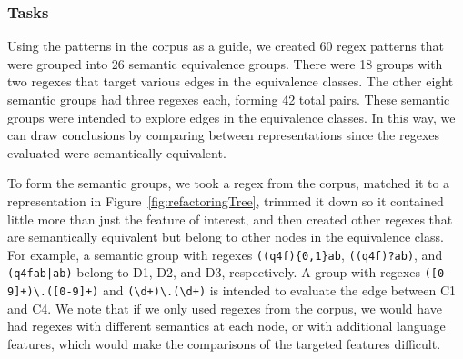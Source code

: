 \subsubsection{Tasks}
Using the patterns in the corpus as a guide, we created 60 regex patterns that were grouped into 26 semantic equivalence groups.
 There were 18 groups with two regexes that target various edges in the equivalence classes.
The other eight semantic groups had three regexes each, forming 42 total pairs.
These semantic groups were intended to explore edges in the equivalence classes. In this way, we can draw conclusions by comparing between representations since the regexes evaluated were semantically equivalent.

To form the semantic groups, we took a regex from the corpus, matched it to a representation in Figure~\ref{fig:refactoringTree}, trimmed it down so it contained little more than just the feature of interest, and then created other regexes that are semantically equivalent but belong to other nodes in the equivalence class. For example, a semantic group with regexes \verb!((q4f){0,1}ab!, \verb!((q4f)?ab)!, and \verb!(q4fab|ab)! belong to D1, D2, and D3, respectively.
A  group with regexes \verb!([0-9]+)\.([0-9]+)! and  \verb!(\d+)\.(\d+)! is intended to evaluate the edge between C1 and C4.
We note that if we only used regexes from the corpus, we would have had regexes with different semantics at each node, or with additional language features, which would make the comparisons of the targeted features  difficult.




%


